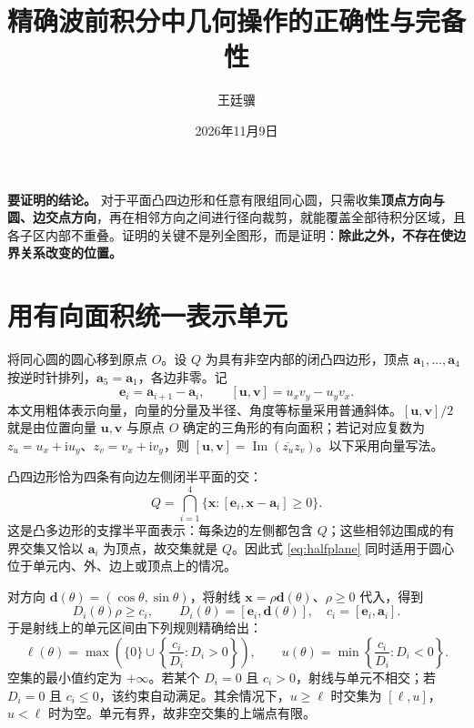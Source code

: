 \documentclass[UTF8,11pt,a4paper,fontset=fandol]{ctexart}
\title{精确波前积分中几何操作的正确性与完备性}
\author{王廷骥}
\date{2026年11月9日}
\numberwithin{equation}{section}
\newcommand{\cross}[2]{[#1,#2]}
\begin{document}
\maketitle
\noindent\textbf{要证明的结论。}
对于平面凸四边形和任意有限组同心圆，只需收集\textbf{顶点方向与圆、边交点方向}，再在相邻方向之间进行径向裁剪，就能覆盖全部待积分区域，且各子区内部不重叠。证明的关键不是列全图形，而是证明：\textbf{除此之外，不存在使边界关系改变的位置。}

\section{用有向面积统一表示单元}
将同心圆的圆心移到原点 $O$。设 $Q$ 为具有非空内部的闭凸四边形，顶点 $\bm{a}_1,\ldots,\bm{a}_4$ 按逆时针排列，$\bm{a}_5=\bm{a}_1$，各边非零。记
\[
 \bm{e}_i=\bm{a}_{i+1}-\bm{a}_i,\qquad
 \cross{\bm{u}}{\bm{v}}=u_xv_y-u_yv_x.
\]
本文用粗体表示向量，向量的分量及半径、角度等标量采用普通斜体。$\cross{\bm{u}}{\bm{v}}/2$ 就是由位置向量 $\bm{u},\bm{v}$ 与原点 $O$ 确定的三角形的有向面积；若记对应复数为 $z_u=u_x+\mathrm{i}u_y$、$z_v=v_x+\mathrm{i}v_y$，则 $\cross{\bm{u}}{\bm{v}}=\operatorname{Im}(\overline{z_u}z_v)$。以下采用向量写法。

凸四边形恰为四条有向边左侧闭半平面的交：
\begin{equation}\label{eq:halfplane}
 Q=\bigcap_{i=1}^{4}\{\bm{x}:\cross{\bm{e}_i}{\bm{x}-\bm{a}_i}\geq0\}.
\end{equation}
这是凸多边形的支撑半平面表示：每条边的左侧都包含 $Q$；这些相邻边围成的有界交集又恰以 $\bm{a}_i$ 为顶点，故交集就是 $Q$。因此式 \eqref{eq:halfplane} 同时适用于圆心位于单元内、外、边上或顶点上的情况。

对方向 $\bm{d}(\theta)=(\cos\theta,\sin\theta)$，将射线 $\bm{x}=\rho \bm{d}(\theta)$、$\rho\geq0$ 代入，得到
\begin{equation}\label{eq:ray}
 D_i(\theta)\rho\geq c_i,\qquad
 D_i(\theta)=\cross{\bm{e}_i}{\bm{d}(\theta)},\quad c_i=\cross{\bm{e}_i}{\bm{a}_i}.
\end{equation}
于是射线上的单元区间由下列规则精确给出：
\begin{equation}\label{eq:bounds}
 \ell(\theta)=\max\left(\{0\}\cup\left\{\frac{c_i}{D_i}:D_i>0\right\}\right),
 \qquad
 u(\theta)=\min\left\{\frac{c_i}{D_i}:D_i<0\right\}.
\end{equation}
空集的最小值约定为 $+\infty$。若某个 $D_i=0$ 且 $c_i>0$，射线与单元不相交；若 $D_i=0$ 且 $c_i\leq0$，该约束自动满足。其余情况下，$u\geq\ell$ 时交集为 $[\ell,u]$，$u<\ell$ 时为空。单元有界，故非空交集的上端点有限。
\end{document}

